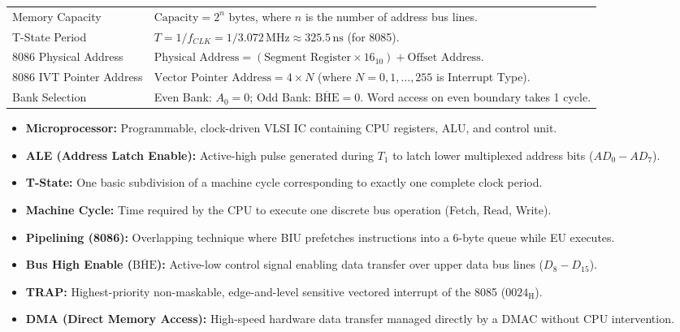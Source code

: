\documentclass[12pt,a4paper]{article}
\renewcommand{\arraystretch}{1.45}
\begin{document}
\begin{tcolorbox}[formulabox, title={Key Formulas at a Glance}]
\renewcommand{\arraystretch}{1.2}
\noindent\begin{tabularx}{\linewidth}{B{4.5cm}Y}
Memory Capacity & $\text{Capacity} = 2^n \text{ bytes}$, where $n$ is the number of address bus lines. \\
T-State Period & $T = 1 / f_{CLK} = 1 / 3.072\,\mathrm{MHz} \approx 325.5\,\mathrm{ns}$ (for 8085). \\
8086 Physical Address & $\text{Physical Address} = (\text{Segment Register} \times 16_{10}) + \text{Offset Address}$. \\
8086 IVT Pointer Address & $\text{Vector Pointer Address} = 4 \times N$ (where $N = 0, 1, \dots, 255$ is Interrupt Type). \\
Bank Selection & Even Bank: $A_0 = 0$; Odd Bank: $\overline{\mathrm{BHE}} = 0$. Word access on even boundary takes 1 cycle. \\
\end{tabularx}\par
\end{tcolorbox}

\begin{tcolorbox}[defbox, title={One-Line Definitions}]
\begin{itemize}[leftmargin=*, itemsep=2pt]
  \item \textbf{Microprocessor:} Programmable, clock-driven VLSI IC containing CPU registers, ALU, and control unit.
  \item \textbf{ALE (Address Latch Enable):} Active-high pulse generated during $T_1$ to latch lower multiplexed address bits ($AD_0-AD_7$).
  \item \textbf{T-State:} One basic subdivision of a machine cycle corresponding to exactly one complete clock period.
  \item \textbf{Machine Cycle:} Time required by the CPU to execute one discrete bus operation (Fetch, Read, Write).
  \item \textbf{Pipelining (8086):} Overlapping technique where BIU prefetches instructions into a 6-byte queue while EU executes.
  \item \textbf{Bus High Enable ($\overline{\mathrm{BHE}}$):} Active-low control signal enabling data transfer over upper data bus lines ($D_8-D_{15}$).
  \item \textbf{TRAP:} Highest-priority non-maskable, edge-and-level sensitive vectored interrupt of the 8085 ($0024_{\mathrm{H}}$).
  \item \textbf{DMA (Direct Memory Access):} High-speed hardware data transfer managed directly by a DMAC without CPU intervention.
\end{itemize}
\end{tcolorbox}
\end{document}
